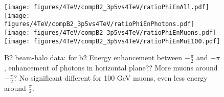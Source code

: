 \begin{figure}
\begin{center}
  \texttt{[image: figures/4TeV/compB2\_3p5vs4TeV/ratioPhiEnAll.pdf]}
  \texttt{[image: figures/4TeV/compB2\_3p5vs4TeV/ratioPhiEnPhotons.pdf]}
  \texttt{[image: figures/4TeV/compB2\_3p5vs4TeV/ratioPhiEnMuons.pdf]}
  \texttt{[image: figures/4TeV/compB2\_3p5vs4TeV/ratioPhiEnMuE100.pdf]}
\end{center}
\vspace{-0.6cm}
 \caption{B2 beam-halo data: for b2 Energy enhancement between $-\frac{\pi}{2}$ and $-\pi$, enhancement of photons in horizontal plane?? More muons around $-\frac{\pi}{2}$? No significant different for 100 GeV muons, even less energy around $\frac{\pi}{2}$.
  \label{xingCompBH2}}
\end{figure}






